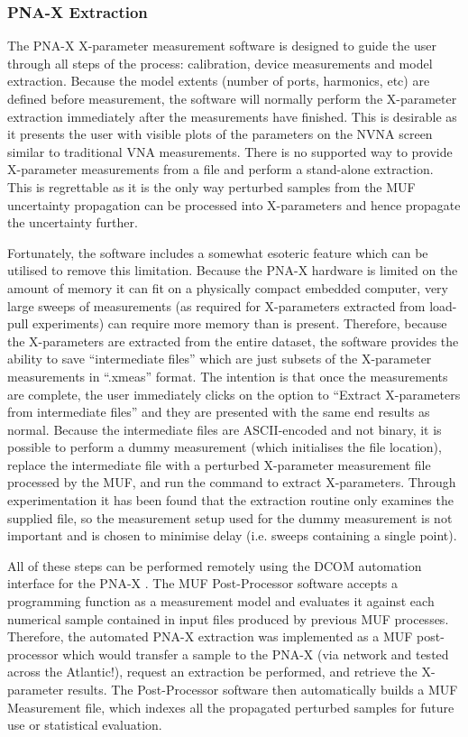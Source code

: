 \documentclass[../thesis/thesis.tex]{subfiles}
\begin{document}
\subsubsection{PNA-X Extraction}

The PNA-X X-parameter measurement software is designed to guide the user through all steps of the process: calibration, device measurements and model extraction. Because the model extents (number of ports, harmonics, etc) are defined before measurement, the software will normally perform the X-parameter extraction immediately after the measurements have finished. This is desirable as it presents the user with visible plots of the parameters on the NVNA screen similar to traditional VNA measurements. There is no supported way to provide X-parameter measurements from a file and perform a stand-alone extraction. This is regrettable as it is the only way perturbed samples from the MUF uncertainty propagation can be processed into X-parameters and hence propagate the uncertainty further.

Fortunately, the software includes a somewhat esoteric feature which can be utilised to remove this limitation. Because the PNA-X hardware is limited on the amount of memory it can fit on a physically compact embedded computer, very large sweeps of measurements (as required for X-parameters extracted from load-pull experiments) can require more memory than is present. Therefore, because the X-parameters are extracted from the entire dataset, the software provides the ability to save ``intermediate files''  which are just subsets of the X-parameter measurements in ``.xmeas'' format.  The intention is that once the measurements are complete, the user immediately clicks on the option to ``Extract X-parameters from intermediate files'' and they are presented with the same end results as normal. Because the intermediate files are ASCII-encoded and not binary, it is possible to perform a dummy measurement (which initialises the file location), replace the intermediate file with a perturbed X-parameter measurement file processed by the MUF, and run the command to extract X-parameters. Through experimentation it has been found that the extraction routine only examines the supplied file, so the measurement setup used for the dummy measurement is not important and is chosen to minimise delay (i.e. sweeps containing a single point).

All of these steps can be performed remotely using the DCOM automation interface for the PNA-X \cite{DCOM}. The MUF Post-Processor software accepts a programming function as a measurement model and evaluates it against each numerical sample contained in input files produced by previous MUF processes. Therefore, the automated PNA-X extraction was implemented as a MUF post-processor which would transfer a sample to the PNA-X (via network and tested across the Atlantic!), request an extraction be performed, and retrieve the X-parameter results. The Post-Processor software then automatically builds a MUF Measurement file, which indexes all the propagated perturbed samples for future use or statistical evaluation.
\end{document}
